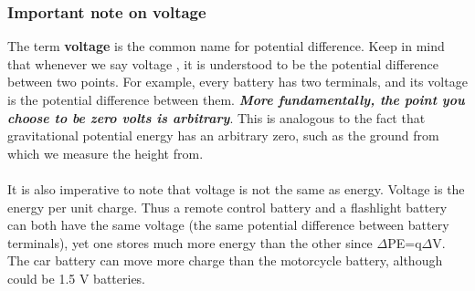 \documentclass[9pt]{article}
\begin{document}
	\subsubsection*{Important note on voltage}
	The term \textbf{voltage} is the common name for potential difference. Keep in mind that whenever we say voltage , it is understood to be the potential difference between two points. For example, every battery has two terminals, and its voltage is the potential difference between them. \textit{\textbf{More fundamentally, the point you choose to be zero volts is arbitrary}}. This is analogous to the fact that gravitational potential energy has an arbitrary zero, such as the ground from which we measure the height from. \\ \\
	It is also imperative to note that voltage is not the same as energy. Voltage is the energy per unit charge. Thus a remote control battery and a flashlight battery can both have the same voltage (the same potential difference between battery terminals), yet one stores much more energy than the other since $\Delta$PE=q$\Delta$V. The car battery can move more charge than the motorcycle battery, although could be 1.5 V batteries.
\end{document}
